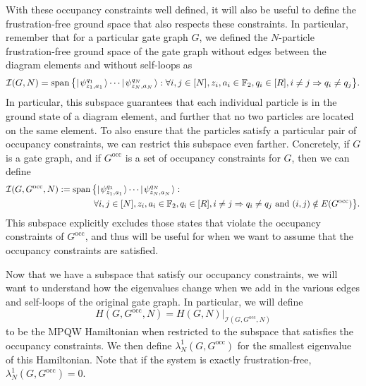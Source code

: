 \documentclass[../thesis-main/thesis-main]{subfiles}
\begin{document}

With these occupancy constraints well defined, it will also be useful to define the frustration-free ground space that also respects these constraints.  In particular, remember that for a particular gate graph $G$, we defined the $N$-particle frustration-free ground space of the gate graph without edges between the diagram elements and without self-loops as
\begin{equation}
  \mathcal{I}(G,N) = \operatorname{span} \big\{ |\mspace{2mu} \psi_{z_1,a_1}^{q_1} \mspace{2mu} \rangle \cdots |\mspace{2mu} \psi_{z_N,a_N}^{q_N} \mspace{2mu} \rangle  :  \forall i,j\in [N], z_i,a_i\in \mathbb{F}_2, q_i\in [R], i\neq j \Rightarrow q_i\neq q_j\big\}.
\end{equation}
In particular, this subspace guarantees that each individual particle is in the ground state of a diagram element, and further that no two particles are located on the same element.  To also ensure that the particles satisfy a particular pair of occupancy constraints, we can restrict this subspace even farther. Concretely, if $G$ is a gate graph, and if $G^{\text{occ}}$ is a set of occupancy constraints for $G$, then we can define
\begin{align}
  \mathcal{I}(G,G^{\text{occ}},N) &:= \operatorname{span}\big\{ |\mspace{2mu} \psi_{z_1,a_1}^{q_1} \mspace{2mu} \rangle \cdots |\mspace{2mu} \psi_{z_N,a_N}^{q_N} \mspace{2mu} \rangle:\nonumber\\
  &\qquad\qquad  \forall i,j\in [N], z_i,a_i\in \mathbb{F}_2, q_i\in [R], i\neq j \Rightarrow q_i\neq q_j \text{ and } (i,j)\notin E(G^{\text{occ}})\big\}.\label{eq:I_Goc_n}
\end{align}
This subspace explicitly excludes those states that violate the occupancy constraints of $G^{\text{occ}}$, and thus will be useful for when we want to assume that the occupancy constraints are satisfied. 

Now that we have a subspace that satisfy our occupancy constraints, we will want to understand how the eigenvalues change when we add in the various edges and self-loops of the original gate graph.  In particular, we will define
\begin{equation}
  H(G,G^{\text{occ}},N) = H(G,N) \big |_{\mathcal{I}(G,G^{\text{occ}},N)}
\end{equation}
to be the MPQW Hamiltonian when restricted to the subspace that satisfies the occupancy constraints.  We then define $\lambda_N^1(G,G^{\text{occ}})$ for the smallest eigenvalue of this Hamiltonian.  Note that if the system is exactly frustration-free, $\lambda_N^1(G,G^{\text{occ}}) = 0$.
\end{document}
